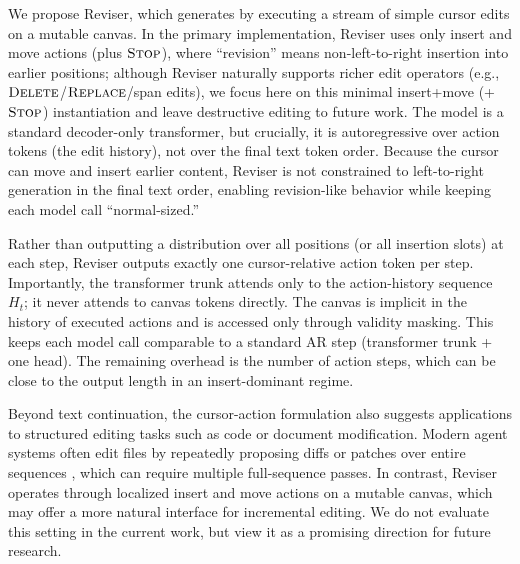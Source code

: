 \documentclass[11pt]{article}
\DeclareRobustCommand{\Stop}{\ifmmode\text{\textsc{Stop}}\else\textsc{Stop}\fi}
\begin{document}
We propose Reviser, which generates by executing a stream of simple cursor edits on a mutable canvas. In the primary implementation, Reviser uses only insert and move actions (plus $\Stop$), where ``revision'' means non-left-to-right insertion into earlier positions; although Reviser naturally supports richer edit operators (e.g., $\textsc{Delete}$/$\textsc{Replace}$/span edits), we focus here on this minimal insert+move (+$\Stop$) instantiation and leave destructive editing to future work. The model is a standard decoder-only transformer, but crucially, it is autoregressive over action tokens (the edit history), not over the final text token order. Because the cursor can move and insert earlier content, Reviser is not constrained to left-to-right generation in the final text order, enabling revision-like behavior while keeping each model call ``normal-sized.''

Rather than outputting a distribution over all positions (or all insertion slots) at each step, Reviser outputs exactly one cursor-relative action token per step. Importantly, the transformer trunk attends only to the action-history sequence $H_t$; it never attends to canvas tokens directly. The canvas is implicit in the history of executed actions and is accessed only through validity masking. This keeps each model call comparable to a standard AR step (transformer trunk + one head). The remaining overhead is the number of action steps, which can be close to the output length in an insert-dominant regime.

Beyond text continuation, the cursor-action formulation also suggests applications to structured editing tasks such as code or document modification. Modern agent systems often edit files by repeatedly proposing diffs or patches over entire sequences \citep{yang2024sweagent,gauthier2024aider}, which can require multiple full-sequence passes. In contrast, Reviser operates through localized insert and move actions on a mutable canvas, which may offer a more natural interface for incremental editing. We do not evaluate this setting in the current work, but view it as a promising direction for future research.
\end{document}
